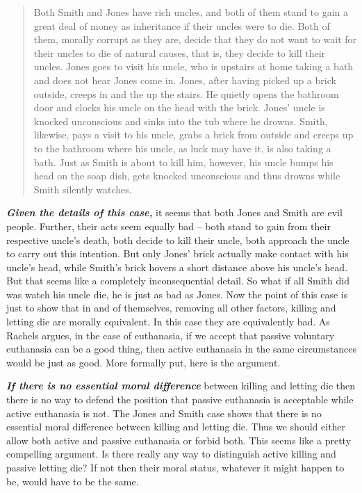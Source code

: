 \documentclass[12pt, openany]{book}
\begin{document}
\begin{quote}
Both Smith and Jones have rich uncles, and both of them stand to gain a great deal of money as inheritance if their uncles were to die. Both of them, morally corrupt as they are, decide that they do not want to wait for their uncles to die of natural causes, that is, they decide to kill their uncles. Jones goes to visit his uncle, who is upstairs at home taking a bath and does not hear Jones come in. Jones, after having picked up a brick outside, creeps in and the up the stairs. He quietly opens the bathroom door and clocks his uncle on the head with the brick. Jones' uncle is knocked unconscious and sinks into the tub where he drowns. Smith, likewise, pays a visit to his uncle, grabs a brick from outside and creeps up to the bathroom where his uncle, as luck may have it, is also taking a bath. Just as Smith is about to kill him, however, his uncle bumps his head on the soap dish, gets knocked unconscious and thus drowns while Smith silently watches.
\end{quote}

\textbf{\emph{Given the details of this case,}} it seems that both Jones and Smith are evil people. Further, their acts seem equally bad -- both stand to gain from their respective uncle's death, both decide to kill their uncle, both approach the uncle to carry out this intention. But only Jones' brick actually make contact with his uncle's head, while Smith's brick hovers a short distance above his uncle's head. But that seems like a completely inconsequential detail. So what if all Smith did was watch his uncle die, he is just as bad as Jones. Now the point of this case is just to show that in and of themselves, removing all other factors, killing and letting die are morally equivalent. In this case they are equivalently bad. As Rachels argues, in the case of euthanasia, if we accept that passive voluntary euthanasia can be a good thing, then active euthanasia in the same circumstances would be just as good. More formally put, here is the argument.

\textbf{\emph{If there is no essential moral difference}} between killing and letting die then there is no way to defend the position that passive euthanasia is acceptable while active euthanasia is not. The Jones and Smith case shows that there is no essential moral difference between killing and letting die. Thus we should either allow both active and passive euthanasia or forbid both. This seems like a pretty compelling argument. Is there really any way to distinguish active killing and passive letting die? If not then their moral status, whatever it might happen to be, would have to be the same.
\end{document}
